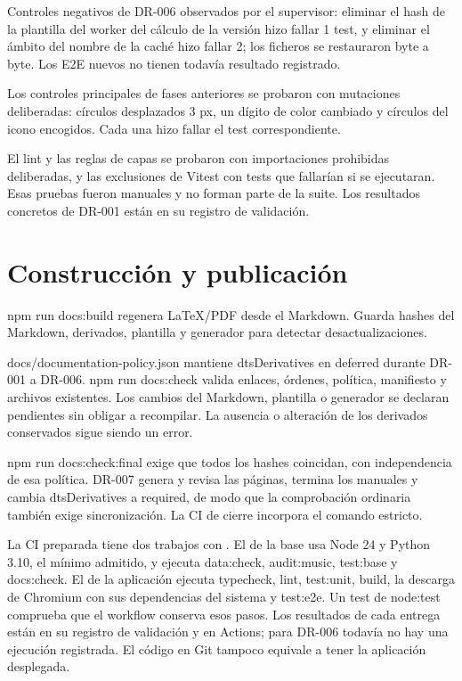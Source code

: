 \documentclass[a4paper,11pt]{article}
\let\originaltexttt\texttt
\renewcommand{\texttt}[1]{\originaltexttt{\seqsplit{#1}}}
\begin{document}
Controles negativos de DR-006 observados por el supervisor: eliminar el
hash de la plantilla del worker del cálculo de la versión hizo fallar 1
test, y eliminar el ámbito del nombre de la caché hizo fallar 2; los
ficheros se restauraron byte a byte. Los E2E nuevos no tienen todavía
resultado registrado.

Los controles principales de fases anteriores se probaron con mutaciones
deliberadas: círculos desplazados 3 px, un dígito de color cambiado y
círculos del icono encogidos. Cada una hizo fallar el test
correspondiente.

El lint y las reglas de capas se probaron con importaciones prohibidas
deliberadas, y las exclusiones de Vitest con tests que fallarían si se
ejecutaran. Esas pruebas fueron manuales y no forman parte de la suite.
Los resultados concretos de DR-001 están en su registro de validación.

\Needspace{4cm}
\section{Construcción y
publicación}\label{construcciuxf3n-y-publicaciuxf3n}

npm run docs:build regenera LaTeX/PDF desde el Markdown. Guarda hashes
del Markdown, derivados, plantilla y generador para detectar
desactualizaciones.

docs/documentation-policy.json mantiene dtsDerivatives en deferred
durante DR-001 a DR-006. npm run docs:check valida enlaces, órdenes,
política, manifiesto y archivos existentes. Los cambios del Markdown,
plantilla o generador se declaran pendientes sin obligar a recompilar.
La ausencia o alteración de los derivados conservados sigue siendo un
error.

npm run docs:check:final exige que todos los hashes coincidan, con
independencia de esa política. DR-007 genera y revisa las páginas,
termina los manuales y cambia dtsDerivatives a required, de modo que la
comprobación ordinaria también exige sincronización. La CI de cierre
incorpora el comando estricto.

La CI preparada tiene dos trabajos con
\texttt{npm\ ci\ -\/-ignore-scripts}. El de la base usa Node 24 y Python
3.10, el mínimo admitido, y ejecuta data:check, audit:music, test:base y
docs:check. El de la aplicación ejecuta typecheck, lint, test:unit,
build, la descarga de Chromium con sus dependencias del sistema y
test:e2e. Un test de node:test comprueba que el workflow conserva esos
pasos. Los resultados de cada entrega están en su registro de validación
y en Actions; para DR-006 todavía no hay una ejecución registrada. El
código en Git tampoco equivale a tener la aplicación desplegada.
\end{document}
